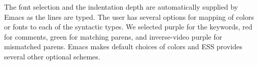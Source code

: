 \documentclass{article}
\newif\ifdraft
\newcommand{\stexttt}[1]{{\small\texttt{#1}}}
\newcommand{\emptyfig}{
\hspace*{42pt}\rule{324pt}{.25pt}\\
\hspace*{42pt}\rule{.25pt}{10pc}
\rule{316pt}{.25pt}
\rule{.25pt}{10pc}}
\begin{document}

The font selection and the indentation depth are automatically
supplied by Emacs as the lines are typed.  The user has several
options for mapping of colors or fonts to each of the syntactic types.
We selected
purple for the keywords, red for comments, green for matching parens,
and inverse-video purple for mismatched parens.  Emacs makes default
choices of colors and ESS provides several other optional schemes.


\end{document}
